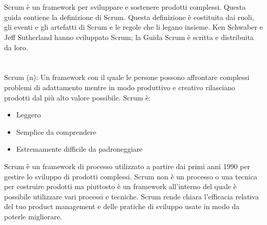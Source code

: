 
\section*{\color{Blue}{Scopo della Guida Scrum}}%
\label{sec:purpose}
Scrum \`e un framework per sviluppare e sostenere prodotti complessi. Questa guida contiene la definizione di Scrum. Questa 
definizione \`e costituita dai ruoli, gli eventi e gli artefatti di Scrum e le regole che li legano insieme. Ken Schwaber e Jeff 
Sutherland hanno sviluppato Scrum; la Guida Scrum \`e scritta e distribuita da loro.

\section*{\color{Blue}{Overview di Scrum}}%
\label{sec:overview}
Scrum (n): Un framework con il quale le persone possono affrontare complessi problemi di adattamento mentre in modo 
produttivo e creativo rilasciano prodotti dal pi\`u alto valore possibile. Scrum \`e:

\begin{itemize}
\item Leggero
\item Semplice da comprendere
\item Estremamente difficile da padroneggiare
\end{itemize}

Scrum \`e un framework di processo utilizzato a partire dai primi anni 1990 per gestire lo sviluppo di prodotti complessi. 
Scrum non \`e un processo o una tecnica per costruire prodotti ma piuttosto è un framework all'interno del quale \`e possibile 
utilizzare vari processi e tecniche. Scrum rende chiara l'efficacia relativa del tuo product management e delle pratiche di 
sviluppo usate in modo da poterle migliorare.

